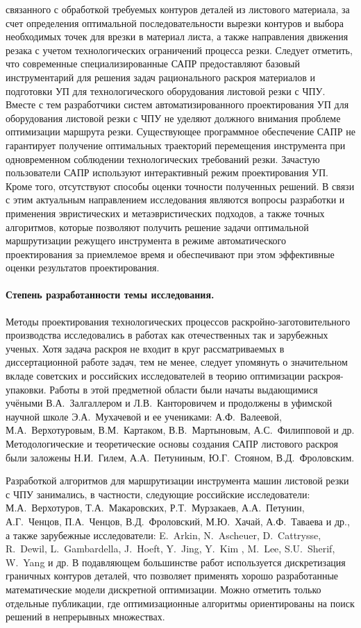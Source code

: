 связанного с обработкой требуемых контуров деталей из листового материала,
за счет определения оптимальной последовательности вырезки контуров
и выбора необходимых точек для врезки в материал листа,
а также направления движения резака
с учетом технологических ограничений процесса резки.
Следует отметить, что современные специализированные САПР предоставляют
базовый инструментарий для решения задач рационального раскроя материалов
и подготовки УП для технологического оборудования листовой резки с ЧПУ.
Вместе с тем разработчики систем автоматизированного проектирования УП
для оборудования листовой резки с ЧПУ не уделяют должного внимания
проблеме оптимизации маршрута резки.
Существующее программное обеспечение САПР не гарантирует
получение оптимальных траекторий перемещения инструмента
при одновременном соблюдении технологических требований резки.
Зачастую пользователи САПР используют интерактивный режим проектирования УП.
Кроме того, отсутствуют способы оценки точности полученных решений.
В связи с этим актуальным направлением
исследования являются
вопросы разработки и
применения эвристических и метаэвристических подходов,
а также точных алгоритмов,
которые позволяют получить решение задачи
оптимальной маршрутизации
режущего инструмента
в режиме автоматического проектирования
за приемлемое время
и обеспечивают
при этом
эффективные оценки результатов проектирования.

\paragraph*{Степень разработанности темы исследования.}

Методы проектирования технологических процессов
раскройно-заготовительного производства
исследовались в работах как отечественных так и зарубежных ученых.
Хотя задача раскроя не входит в круг рассматриваемых в диссертационной работе задач,
тем не менее, следует упомянуть о значительном вкладе советских и российских исследователей
в теорию оптимизации раскроя-упаковки.
Работы в этой предметной области были начаты выдающимися учёными
В.А.~Залгаллером и Л.В.~Канторовичем
и продолжены в уфимской научной школе
Э.А.~Мухачевой и ее учениками:
А.Ф.~Валеевой, М.А.~Верхотуровым, В.М.~Картаком, В.В.~Мартыновым, А.С.~Филипповой и др.
Методологические и теоретические основы создания САПР листового раскроя были заложены
Н.И.~Гилем, А.А.~Петуниным, Ю.Г.~Стояном, В.Д.~Фроловским.

Разработкой алгоритмов для маршрутизации инструмента машин листовой резки с ЧПУ занимались,
в частности, следующие российские исследователи:
М.А.~Верхотуров, Т.А.~Макаровских, Р.Т.~Мурзакаев, А.А.~Петунин, А.Г.~Ченцов,
П.А.~Ченцов, В.Д.~Фроловский, М.Ю.~Хачай,
А.Ф.~Таваева
и др.,
а также зарубежные исследователи:
E.~Arkin, N.~Ascheuer, D.~Cattrysse, R.~Dewil, L.~Gambardella, J.~Hoeft, Y.~Jing, Y.~Kim , M.~Lee, S.U.~Sherif, W.~Yang и др.
В подавляющем большинстве работ
используется дискретизация граничных контуров деталей,
что позволяет применять хорошо разработанные математические модели дискретной оптимизации.
Можно отметить только отдельные публикации,
где оптимизационные алгоритмы ориентированы на поиск решений в непрерывных множествах.

